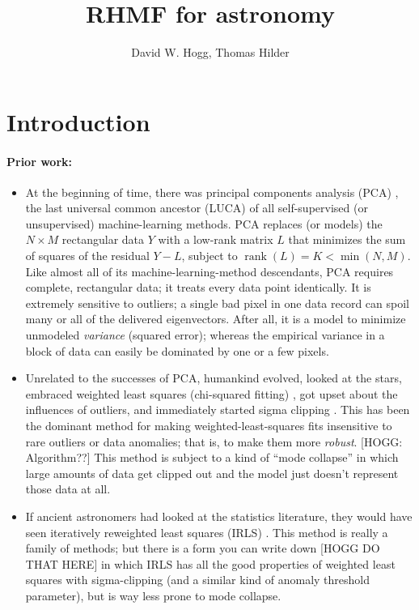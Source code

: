 \documentclass{article}
\DeclareMathOperator{\rank}{rank}
\begin{document}
\title{RHMF for astronomy}
\author{David W. Hogg, Thomas Hilder}
\maketitle

\section{Introduction}

\paragraph{Prior work:}
\begin{itemize}
    \item At the beginning of time, there was principal components analysis (PCA) \cite{pca}, the last universal common ancestor (LUCA) of all self-supervised (or unsupervised) machine-learning methods.
    PCA replaces (or models) the $N\times M$ rectangular data $Y$ with a low-rank matrix $L$ that minimizes the sum of squares of the residual $Y-L$, subject to $\rank(L)=K<\min(N,M)$.
    Like almost all of its machine-learning-method descendants, PCA requires complete, rectangular data; it treats every data point identically.
    It is extremely sensitive to outliers; a single bad pixel in one data record can spoil many or all of the delivered eigenvectors.
    After all, it is a model to minimize unmodeled \emph{variance} (squared error); whereas the empirical variance in a block of data can easily be dominated by one or a few pixels.
    \item Unrelated to the successes of PCA, humankind evolved, looked at the stars, embraced weighted least squares (chi-squared fitting) \cite{laplace}, got upset about the influences of outliers, and immediately started sigma clipping \cite{sigmaclip}.
    This has been the dominant method for making weighted-least-squares fits insensitive to rare outliers or data anomalies; that is, to make them more \emph{robust}.
    [HOGG: Algorithm??]
    This method is subject to a kind of ``mode collapse'' in which large amounts of data get clipped out and the model just doesn't represent those data at all.
    \item If ancient astronomers had looked at the statistics literature, they would have seen iteratively reweighted least squares (IRLS) \cite{irls}.
    This method is really a family of methods; but there is a form you can write down [HOGG DO THAT HERE] in which IRLS has all the good properties of weighted least squares with sigma-clipping (and a similar kind of anomaly threshold parameter), but is way less prone to mode collapse.

\end{itemize}
\end{document}

